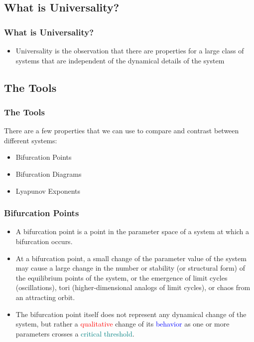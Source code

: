 \documentclass[
	11pt, %
	aspectratio=169, %
]{beamer}
\begin{document}

\subsection{What is Universality?}

\begin{frame}
	\frametitle{What is Universality?}
	
	\begin{itemize}
        \item Universality is the observation that there are properties for a large class of systems that are independent of the dynamical details of the system
    \end{itemize}

\end{frame}


\subsection{The Tools}

\begin{frame}
	\frametitle{The Tools}
	There are a few properties that we can use to compare and contrast between different systems: \pause
    \begin{itemize}
        \item Bifurcation Points \pause
        \item Bifurcation Diagrams \pause
        \item Lyapunov Exponents
    \end{itemize}

\end{frame}


\begin{frame}
	\frametitle{Bifurcation Points}
    \begin{itemize}
        \item A bifurcation point is a point in the parameter space of a system at which a bifurcation occurs. \pause
        \item At a bifurcation point, a small change of the parameter value of the system may cause a large change in the number or stability (or structural form) of the equilibrium points of the system, or the emergence of limit cycles (oscillations), tori (higher-dimensional analogs of limit cycles), or chaos from an attracting orbit. \pause
        \item The bifurcation point itself does not represent any dynamical change of the system, but rather a \textcolor{red}{qualitative} change of its \textcolor{blue}{behavior} as one or more parameters crosses a \textcolor{teal}{critical threshold}.
    \end{itemize}
\end{frame}
\end{document}
